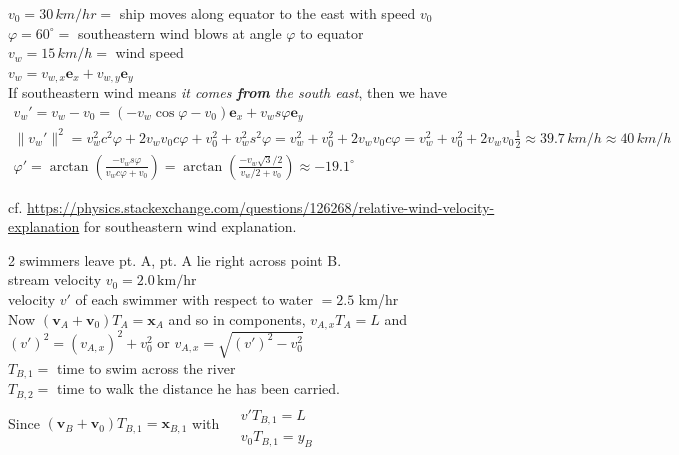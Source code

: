  $v_0 = 30 \, km/hr = $ ship moves along equator to the east with speed $v_0$ \\
$\varphi = 60^{\circ} = $ southeastern wind blows at angle $\varphi$ to equator \\
$v_w = 15 \, km /h = $ wind speed \\
$v_w = v_{w,x} \mathbf{e}_x + v_{w,y} \mathbf{e}_y$ \\
If southeastern wind means \emph{it comes \textbf{from} the south east}, then we have
\[
\begin{gathered}
	v_w' = v_w - v_0 = (-v_w \cos{\varphi} - v_0) \mathbf{e}_x + v_w s{\varphi} \mathbf{e}_y \\
	\| v_w' \|^2 = v_w^2 c^2{\varphi} + 2v_w v_0 c{\varphi} + v_0^2 + v_w^2 s^2{\varphi} = v_w^2 + v_0^2 + 2v_w v_0 c{\varphi} = v_w^2 + v_0^2 + 2v_w v_0 \frac{1}{2} \approx 39.7 \, km /h \approx 40 \, km/h \\
	\varphi' = \arctan{ \left( \frac{ -v_w s{\varphi} }{ v_w c{\varphi} + v_0}  \right) } = \arctan{ \left( \frac{-v_w \sqrt{3} / 2}{ v_w /2 + v_0 } \right) } \approx -19.1^{\circ}
\end{gathered}
\]

cf. \url{https://physics.stackexchange.com/questions/126268/relative-wind-velocity-explanation} for southeastern wind explanation.


2 swimmers leave pt. A, pt. A lie right across point B. \\
stream velocity $v_0 = 2.0 \, \text{km}/\text{hr}$ \\
velocity $v'$ of each swimmer with respect to water $=2.5$ km/hr \\
Now $(\mathbf{v}_A + \mathbf{v}_0) T_A = \mathbf{x}_A$ and so in components, $v_{A,x} T_A = L$ and $(v')^2 = (v_{A,x})^2 + v_0^2$ or $v_{A,x} = \sqrt{(v')^2 - v_0^2}$ \\

$T_{B,1} = $ time to swim across the river \\
$T_{B,2} = $ time to walk the distance he has been carried. \\

Since $(\mathbf{v}_B + \mathbf{v}_0) T_{B,1} = \mathbf{x}_{B,1}$ with $\begin{aligned} & \quad \\ 
	& v' T_{B,1} = L \\
	& v_0 T_{B,1} = y_B \end{aligned}$ \\

